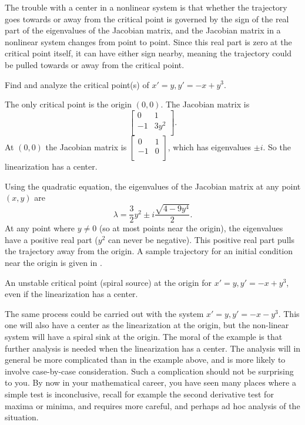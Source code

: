 The trouble with a center in a nonlinear system is that whether the
trajectory goes towards or away from the critical point is governed by the
sign of the real part of the eigenvalues of the Jacobian matrix, and the Jacobian
matrix
in a nonlinear system changes from point to point.  Since this real
part is zero at the critical point itself, it can have either sign nearby,
meaning the trajectory could be pulled towards or away from the critical
point.

\begin{example}
Find and analyze the critical point(s) of 
$x'=y, y' = -x+y^3$.  
\end{example}

\begin{exampleSol}
The only critical point
is the origin $(0,0)$.  The Jacobian matrix is 
\begin{equation*}
\begin{bmatrix}
0 & 1 \\
-1 & 3 y^2 \\
\end{bmatrix} .
\end{equation*}
At 
$(0,0)$ the Jacobian matrix is
$\left[ \begin{smallmatrix}
0 & 1 \\
-1 & 0 \\
\end{smallmatrix} \right]$, which has eigenvalues $\pm i$.  So the
linearization has a center.

Using the quadratic equation, the eigenvalues of the
Jacobian matrix at any point $(x,y)$ are
\begin{equation*}
\lambda = 
\frac{3}{2}y^2 \pm
i
\frac{\sqrt{4-9y^4}}{2} .
\end{equation*}
At any point where $y \not= 0$ (so at most points near the origin), the eigenvalues have a positive real part ($y^2$ can
never be negative).  This positive real part 
pulls the trajectory away from the origin.  A sample trajectory for an
initial condition near the origin is given in
.
\begin{myfig}
\capstart
{}
\caption{An unstable critical point (spiral source) at the origin
for $x'=y, y' = -x+y^3$, even if the linearization has a center.  \label{fig:nlin-unstable-center}}
\end{myfig}
\end{exampleSol}

The same process could be carried out with the system $x'=y, y' = -x-y^3$. This one will also have a center as the linearization at the origin, but the non-linear system will have a spiral sink at the origin. The moral of the example is that further analysis is needed when the
linearization has a center.  The analysis will in general be more
complicated than in the example above, and is more likely to involve
case-by-case consideration.  Such a complication should not be
surprising to you.  By now in your mathematical career, you have
seen many places where a simple test is inconclusive, recall for example
the second derivative test for maxima or minima, and requires more careful,
and perhaps ad hoc analysis of the situation.


